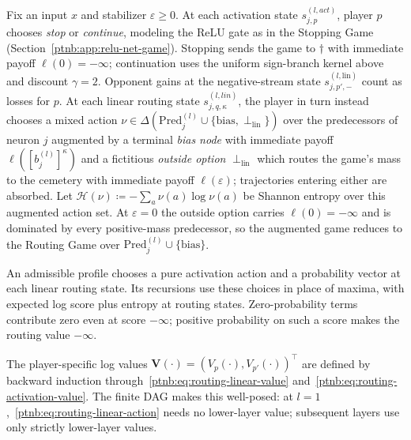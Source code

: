 \begin{definition}\label{ptnb:def:routing-recursion}
Fix an input $x$ and stabilizer $\varepsilon \ge 0$. At each activation state $s_{j,p}^{(l,
    act)}$, player $p$ chooses \emph{stop} or \emph{continue}, modeling the ReLU gate as in the
Stopping Game (Section~\ref{ptnb:app:relu-net-game}). Stopping sends the game to $\dagger$ with
immediate payoff $\ell(0)=-\infty$; continuation uses the uniform sign-branch kernel above and
discount $\gamma=2$. Opponent gains at the negative-stream state $s_{j,p',-}^{(l,\text{lin})}$ count
as losses for $p$. At each linear routing state $s_{j,q,\kappa}^{(l, lin)}$, the player in turn instead
chooses a mixed action $\nu \in \Delta(\mathrm{Pred}_j^{(l)} \cup \{\mathrm{bias},
    \perp_{\mathrm{lin}}\})$ over the predecessors of neuron $j$ augmented by a terminal \emph{bias
node} with immediate payoff $\ell([b_j^{(l)}]^\kappa)$ and a fictitious \emph{outside option}
$\perp_{\mathrm{lin}}$ which routes the game's mass to the cemetery with immediate payoff $\ell
    (\varepsilon)$; trajectories entering either are absorbed. Let $\mathcal{H}(\nu) \coloneqq
    -\sum_{a} \nu(a)\log \nu(a)$ be Shannon entropy over this augmented action set. At $\varepsilon =
    0$ the outside option carries $\ell (0) = -\infty$ and is dominated by every positive-mass
predecessor, so the augmented game reduces to the Routing Game over $\mathrm{Pred}_j^{(l)} \cup
    \{\mathrm{bias}\}$.

An admissible profile chooses a pure activation action and a probability vector at each linear
routing state. Its recursions use these choices in place of maxima, with expected log score plus
entropy at routing states. Zero-probability terms contribute zero even at score $-\infty$;
positive probability on such a score makes the routing value $-\infty$.

The player-specific log values $\mathbf{V}(\cdot)=(V_p(\cdot),V_{p'}(\cdot))^\top$ are defined by
backward induction through~\eqref{ptnb:eq:routing-linear-value} and~\eqref{ptnb:eq:routing-activation-value}.
The finite DAG makes this well-posed: at $l=1$,~\eqref{ptnb:eq:routing-linear-action} needs no
lower-layer value; subsequent layers use only strictly lower-layer values.


\end{definition}
